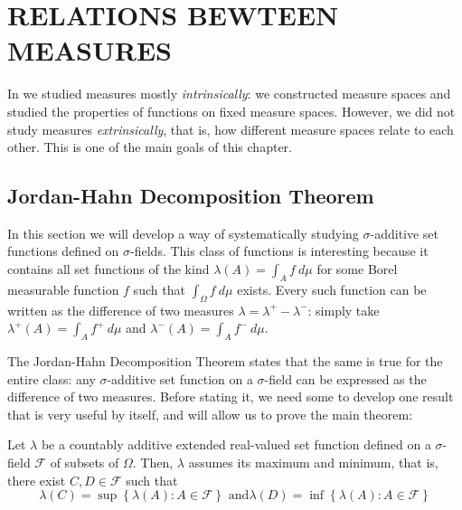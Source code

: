 \chapter{RELATIONS BEWTEEN MEASURES}\label{chapter:relations between measures}

In  we studied
measures mostly \textit{intrinsically}: we constructed measure spaces and
studied the properties of functions on fixed measure spaces. However, we did not
study measures \textit{extrinsically}, that is, how different measure spaces
relate to each other. This is one of the main goals of this chapter.

\section{Jordan-Hahn Decomposition Theorem}\label{section:Jordan-Hahn Decomposition}
In this section we will develop a
way of systematically studying \(\sigma\)-additive set functions defined on
\(\sigma\)-fields. This class of functions is interesting because it contains
all set functions of the kind \(\lambda(A)=\int_{A}f~d\mu\) for some Borel
measurable function \(f\) such that \(\int_{\Omega}f~d\mu\) exists. Every such function can be
written as the difference of two measures \(\lambda=\lambda^+-\lambda^-\):
simply take \(\lambda^+(A)=\int_{A}f^+~d\mu\) and
\(\lambda^-(A)=\int_{A}f^-~d\mu\).

The Jordan-Hahn Decomposition Theorem states that the same is true for the
entire class: any \(\sigma\)-additive set function on a \(\sigma\)-field can be
expressed as the difference of two measures. Before stating it, we need some to
develop one result that is very useful by itself, and will allow us to prove the
main theorem:

\begin{thrm}\label{theorem:sigma-additive function assumes extrema} Let
\(\lambda\) be a countably additive extended real-valued set function defined on
a \(\sigma\)-field \(\mathcal{F}\) of subsets of \(\Omega\). Then, \(\lambda\) assumes
its maximum and minimum, that is, there exist \(C,D\in\mathcal{F}\) such that
	\[\lambda(C)=\sup\left\{\lambda(A)\colon A\in\mathcal{F}\right\} \text{ and
} \lambda(D)=\inf\left\{\lambda(A)\colon A\in\mathcal{F}\right\}\]
\end{thrm}

